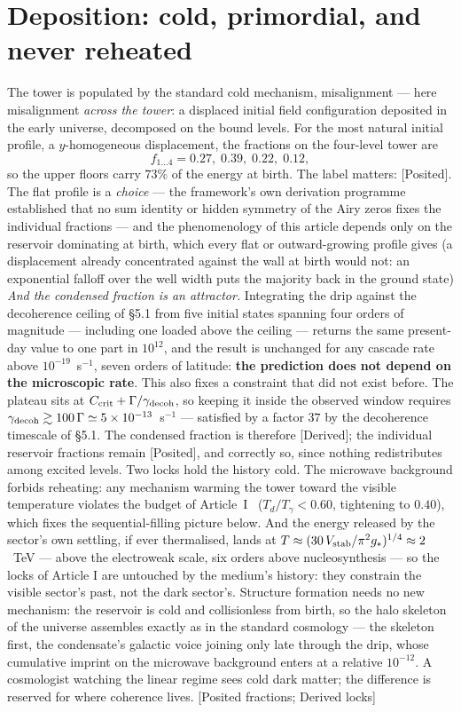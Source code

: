 \section{Deposition: cold, primordial, and never reheated}
The tower is populated by the standard cold mechanism, misalignment --- here misalignment \emph{across the tower}: a displaced initial field configuration deposited in the early universe, decomposed on the bound levels. For the most natural initial profile, a $y$-homogeneous displacement, the fractions on the four-level tower are
\begin{equation}
f_{1\ldots4}=0.27,\;0.39,\;0.22,\;0.12 ,
\end{equation}
so the upper floors carry $73\%$ of the energy at birth. The label matters: [Posited]. The flat profile is a \emph{choice} --- the framework's own derivation programme established that no sum identity or hidden symmetry of the Airy zeros fixes the individual fractions --- and the phenomenology of this article depends only on the reservoir dominating at birth, which every flat or outward-growing profile gives (a displacement already concentrated against the wall at birth would not: an exponential falloff over the well width puts the majority back in the ground state) \emph{And the condensed fraction is an attractor.} Integrating the drip against the decoherence ceiling of \S5.1 from five initial states spanning four orders of magnitude --- including one loaded above the ceiling --- returns the same present-day value to one part in $10^{12}$, and the result is unchanged for any cascade rate above $10^{-19}$~s$^{-1}$, seven orders of latitude: \textbf{the prediction does not depend on the microscopic rate}. This also fixes a constraint that did not exist before. The plateau sits at $C_{\rm crit}+\Gamma/\gamma_{\rm decoh}$, so keeping it inside the observed window requires $\gamma_{\rm decoh}\gtrsim100\,\Gamma\simeq5\times10^{-13}$~s$^{-1}$ --- satisfied by a factor $37$ by the decoherence timescale of \S5.1. The condensed fraction is therefore [Derived]; the individual reservoir fractions remain [Posited], and correctly so, since nothing redistributes among excited levels. Two locks hold the history cold. The microwave background forbids reheating: any mechanism warming the tower toward the visible temperature violates the budget of Article~I~\cite{DDF1} ($T_{d}/T_{\gamma}<0.60$, tightening to $0.40$), which fixes the sequential-filling picture below. And the energy released by the sector's own settling, if ever thermalised, lands at $T\approx(30\,V_{\rm stab}/\pi^{2}g_{*})^{1/4}\approx2$~TeV --- above the electroweak scale, six orders above nucleosynthesis --- so the locks of Article I are untouched by the medium's history: they constrain the visible sector's past, not the dark sector's. Structure formation needs no new mechanism: the reservoir is cold and collisionless from birth, so the halo skeleton of the universe assembles exactly as in the standard cosmology --- the skeleton first, the condensate's galactic voice joining only late through the drip, whose cumulative imprint on the microwave background enters at a relative $10^{-12}$. A cosmologist watching the linear regime sees cold dark matter; the difference is reserved for where coherence lives. [Posited fractions; Derived locks]

